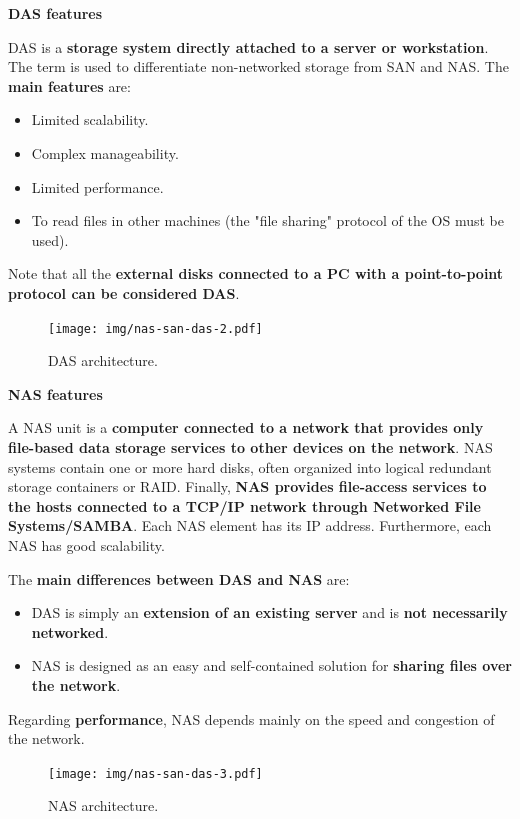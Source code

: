 \begin{flushleft}
	\textcolor{Red2}{ \textbf{DAS features}}
\end{flushleft}
DAS is a \textbf{storage system directly attached to a server or workstation}. The term is used to differentiate non-networked storage from SAN and NAS. The \textbf{main features} are:
\begin{itemize}
	\item Limited scalability.
	\item Complex manageability.
	\item Limited performance.
	\item To read files in other machines (the "file sharing" protocol of the OS must be used).
\end{itemize}
Note that all the \textbf{external disks connected to a PC with a point-to-point protocol can be considered DAS}.
\begin{figure}[!htp]
	\centering
	\texttt{[image: img/nas-san-das-2.pdf]}
	\caption{DAS architecture.}
\end{figure}

\highspace
\begin{flushleft}
	\textcolor{Red2}{ \textbf{NAS features}}
\end{flushleft}
A NAS unit is a \textbf{computer connected to a network that provides only file-based data storage services to other devices on the network}. NAS systems contain one or more hard disks, often organized into logical redundant storage containers or RAID. Finally, \textbf{NAS provides file-access services to the hosts connected to a TCP/IP network through Networked File Systems/SAMBA}. Each NAS element has its IP address. Furthermore, each NAS has good scalability.

\highspace
The \textbf{main differences between DAS and NAS} are:
\begin{itemize}
	\item DAS is simply an \textbf{extension of an existing server} and is \textbf{not necessarily networked}.
	\item NAS is designed as an easy and self-contained solution for \textbf{sharing files over the network}.
\end{itemize}
Regarding \textbf{performance}, NAS depends mainly on the speed and congestion of the network.
\begin{figure}[!htp]
	\centering
	\texttt{[image: img/nas-san-das-3.pdf]}
	\caption{NAS architecture.}
\end{figure}

